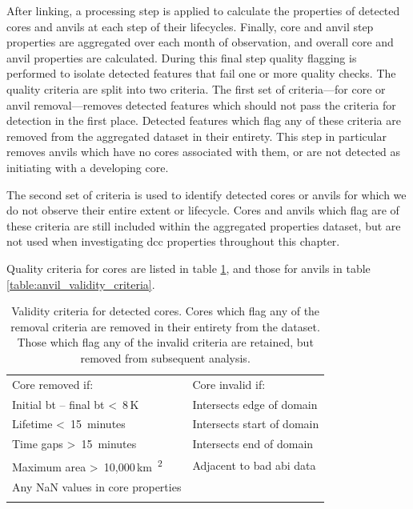After linking, a processing step is applied to calculate the properties of detected cores and anvils at each step of their lifecycles.
Finally, core and anvil step properties are aggregated over each month of observation, and overall core and anvil properties are calculated.
During this final step quality flagging is performed to isolate detected features that fail one or more quality checks.
The quality criteria are split into two criteria.
The first set of criteria---for core or anvil removal---removes detected features which should not pass the criteria for detection in the first place.
Detected features which flag any of these criteria are removed from the aggregated dataset in their entirety.
This step in particular removes anvils which have no cores associated with them, or are not detected as initiating with a developing core.

The second set of criteria is used to identify detected cores or anvils for which we do not observe their entire extent or lifecycle.
Cores and anvils which flag are of these criteria are still included within the aggregated properties dataset, but are not used when investigating \acrshort{dcc} properties throughout this chapter.

Quality criteria for cores are listed in table \ref{table:core_validity_criteria}, and those for anvils in table \ref{table:anvil_validity_criteria}.

\begin{table}[tb]
\centering
\begin{tabular}{ll}
\tophline
Core removed if:                                                    & Core invalid if: \\
\middlehline
Initial \acrshort{bt} -- final \acrshort{bt} \textless~8\,\unit{K}  & Intersects edge of domain \\
Lifetime \textless~15~minutes                                       & Intersects start of domain \\
Time gaps \textgreater~15~minutes                                   & Intersects end of domain \\
Maximum area \textgreater~10,000\,\unit{km\textsuperscript{2}}      & Adjacent to bad \acrshort{abi} data \\
Any NaN values in core properties                                   & \\
\bottomhline
\end{tabular}
\caption[
Validity criteria for detected cores
]{
Validity criteria for detected cores. Cores which flag any of the removal criteria are removed in their entirety from the dataset. Those which flag any of the invalid criteria are retained, but removed from subsequent analysis.}
\label{table:core_validity_criteria}
\end{table}


